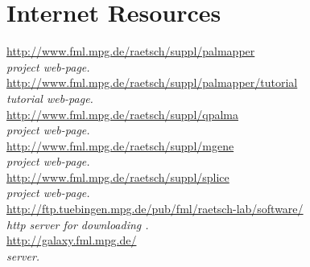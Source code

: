 \documentclass{article}
\begin{document}
\section{Internet Resources}
\url{http://www.fml.mpg.de/raetsch/suppl/palmapper}\\
\emph{\PALMapper{} project web-page.}\\
\url{http://www.fml.mpg.de/raetsch/suppl/palmapper/tutorial}\\
\emph{\PALMapper{} tutorial web-page.}\\
\url{http://www.fml.mpg.de/raetsch/suppl/qpalma}\\
\emph{\QP{} project web-page.}\\
\url{http://www.fml.mpg.de/raetsch/suppl/mgene}\\
\emph{\mGene{} project web-page.}\\
\url{http://www.fml.mpg.de/raetsch/suppl/splice}\\
\emph{\ASP{} project web-page.}\\
\url{http://ftp.tuebingen.mpg.de/pub/fml/raetsch-lab/software/}\\
\emph{http server for downloading \QP{}.}\\
\url{http://galaxy.fml.mpg.de/}\\
\emph{\Galaxy{} server.}\\

%
% 
\end{document}
